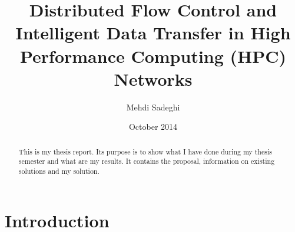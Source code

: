 \documentclass[12pt]{article}
\title{Distributed Flow Control and Intelligent Data Transfer in High Performance Computing (HPC) Networks}
\author{Mehdi Sadeghi}
\date{October 2014}
\begin{document}
\maketitle

\begin{abstract}
This is my thesis report. Its purpose is to show what I have done during my thesis semester and what are my results. It contains the proposal, information on existing solutions and my solution.
\end{abstract}

\section{Introduction}
\end{document}
